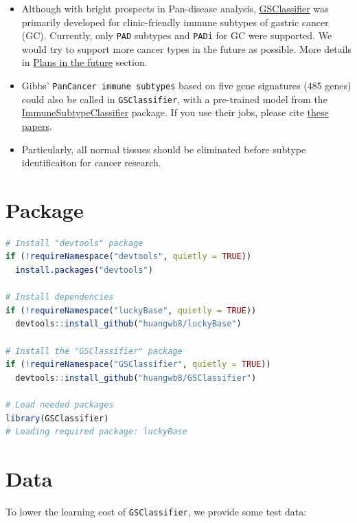 \documentclass[
  12pt,
]{book}
\newcommand{\passthrough}[1]{#1}
\providecommand{\tightlist}{%
  \setlength{\itemsep}{0pt}\setlength{\parskip}{0pt}}
\begin{document}
\begin{itemize}
\tightlist
\item
  Although with bright prospects in Pan-disease analysis, \href{https://github.com/huangwb8/GSClassifier}{GSClassifier} was primarily developed for clinic-friendly immune subtypes of gastric cancer (GC). Currently, only \passthrough{\lstinline!PAD!} subtypes and \passthrough{\lstinline!PADi!} for GC were supported. We would try to support more cancer types in the future as possible. More details in \href{https://github.com/huangwb8/GSClassifier/wiki/Plans-in-the-future}{Plans in the future} section.
\item
  Gibbs' \passthrough{\lstinline!PanCancer immune subtypes!} based on five gene signatures (485 genes) could also be called in \passthrough{\lstinline!GSClassifier!}, with a pre-trained model from the \href{https://github.com/CRI-iAtlas/ImmuneSubtypeClassifier}{ImmuneSubtypeClassifier} package. If you use their jobs, please cite \href{https://github.com/huangwb8/GSClassifier/wiki/Introduction\#Reference}{these papers}.
\item
  Particularly, all normal tissues should be eliminated before subtype identificaiton for cancer research.
\end{itemize}

\hypertarget{package}{%
\section{Package}\label{package}}

\begin{lstlisting}[language=R]
# Install "devtools" package
if (!requireNamespace("devtools", quietly = TRUE))
  install.packages("devtools")

# Install dependencies
if (!requireNamespace("luckyBase", quietly = TRUE))
  devtools::install_github("huangwb8/luckyBase")

# Install the "GSClassifier" package
if (!requireNamespace("GSClassifier", quietly = TRUE))
  devtools::install_github("huangwb8/GSClassifier")

# Load needed packages
library(GSClassifier)
# Loading required package: luckyBase
\end{lstlisting}

\hypertarget{data}{%
\section{Data}\label{data}}

To lower the learning cost of \passthrough{\lstinline!GSClassifier!}, we provide some test data:
\end{document}
